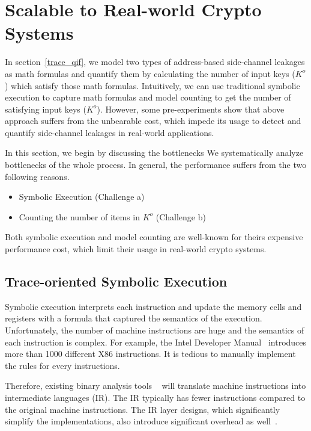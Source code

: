 \section{Scalable to Real-world Crypto Systems}

In section~\ref{trace_qif}, we model two types of address-based side-channel
leakages
as math formulas and quantify them by calculating the number of input
keys ($K^o$) which satisfy those math formulas. Intuitively, we can use
traditional symbolic execution to capture math formulas and model
counting to get the number of satisfying input keys ($K^o$).
However, some pre-experiments show that above approach suffers from the unbearable cost, 
which impede its usage
to detect and quantify side-channel leakages in real-world applications. 

In this section, we begin by discussing the bottlenecks 
We systematically analyze bottlenecks of the whole process. In general, the performance suffers
from the two following reasons. 
\begin{itemize}
    \item Symbolic Execution (Challenge a)
    \item Counting the number of items in $K^o$ (Challenge b)
\end{itemize}

Both symbolic execution and model counting are well-known for theirs
expensive performance cost, which limit their usage in real-world
crypto systems.

\subsection{Trace-oriented Symbolic Execution}
Symbolic execution interprets each instruction and update the memory cells and registers with a 
formula that captured the semantics of the execution. Unfortunately, the number of machine instructions 
are huge and the semantics of each instruction is complex. For example, the Intel Developer Manual~\cite{intelsys}
introduces more than 1000 different X86 instructions. It is tedious to manually implement the
rules for every instructions.

Therefore, existing binary analysis tools ~\cite{shoshitaishvili2016state, 10.1007/978-3-642-22110-1_37} 
will translate machine instructions into intermediate languages (IR). The IR typically has fewer 
instructions compared to the original machine instructions. The IR layer designs, which significantly
simplify the implementations, also introduce significant overhead as well~\cite{217563}.

